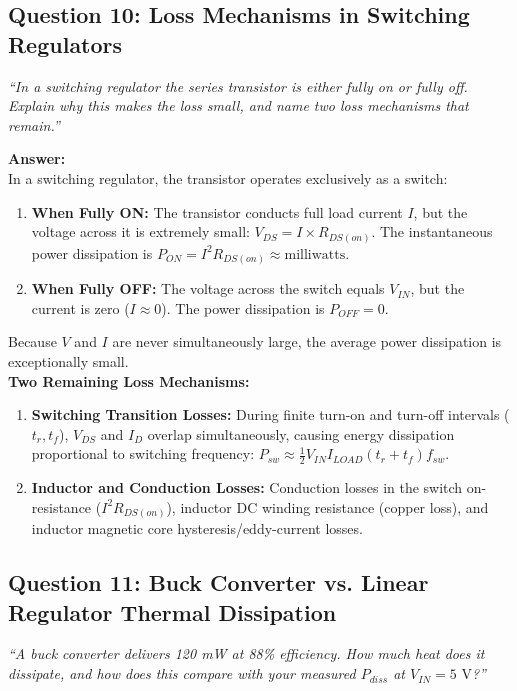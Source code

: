 \documentclass[11pt,a4paper]{article}
\begin{document}
\subsection{Question 10: Loss Mechanisms in Switching Regulators}
\textit{``In a switching regulator the series transistor is either fully on or fully off. Explain why this makes the loss small, and name two loss mechanisms that remain.''}

\textbf{Answer:}\\
In a switching regulator, the transistor operates exclusively as a switch:
\begin{enumerate}
    \item \textbf{When Fully ON:} The transistor conducts full load current $I$, but the voltage across it is extremely small: $V_{DS} = I \times R_{DS(on)}$. The instantaneous power dissipation is $P_{ON} = I^2 R_{DS(on)} \approx \text{milliwatts}$.
    \item \textbf{When Fully OFF:} The voltage across the switch equals $V_{IN}$, but the current is zero ($I \approx 0$). The power dissipation is $P_{OFF} = 0$.
\end{enumerate}
Because $V$ and $I$ are never simultaneously large, the average power dissipation is exceptionally small.\\
\textbf{Two Remaining Loss Mechanisms:}
\begin{enumerate}
    \item \textbf{Switching Transition Losses:} During finite turn-on and turn-off intervals ($t_r, t_f$), $V_{DS}$ and $I_D$ overlap simultaneously, causing energy dissipation proportional to switching frequency: $P_{sw} \approx \frac{1}{2} V_{IN} I_{LOAD} (t_r + t_f) f_{sw}$.
    \item \textbf{Inductor and Conduction Losses:} Conduction losses in the switch on-resistance ($I^2 R_{DS(on)}$), inductor DC winding resistance (copper loss), and inductor magnetic core hysteresis/eddy-current losses.
\end{enumerate}

\subsection{Question 11: Buck Converter vs. Linear Regulator Thermal Dissipation}
\textit{``A buck converter delivers 120 mW at 88\% efficiency. How much heat does it dissipate, and how does this compare with your measured $P_{diss}$ at $V_{IN} = 5\text{ V}$?''}
\end{document}
